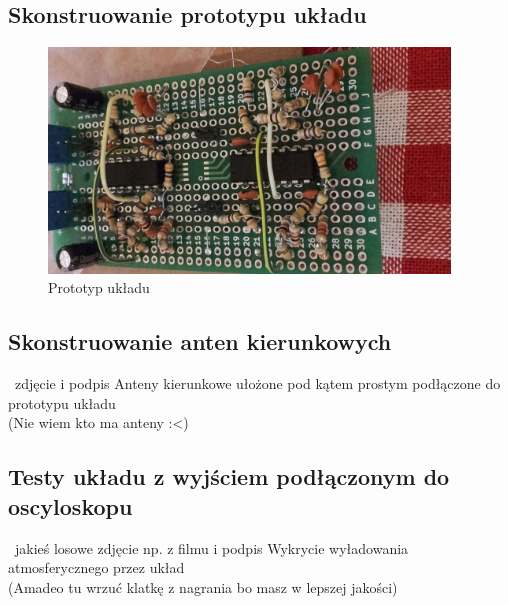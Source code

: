 \documentclass[12pt]{article}
\begin{document}
\subsection{Skonstruowanie prototypu układu}
\begin{figure}[H]
\begin{center}
\includegraphics[width=0.95\textwidth]{figures/plytka.png}
\caption{Prototyp układu}
\end{center}
\end{figure}

\subsection{Skonstruowanie anten kierunkowych}
\ zdjęcie i podpis Anteny kierunkowe ułożone pod kątem prostym podłączone do prototypu układu\\
(Nie wiem kto ma anteny :<)

\subsection{Testy układu z wyjściem podłączonym do oscyloskopu}
\ jakieś losowe zdjęcie np. z filmu i podpis Wykrycie wyładowania atmosferycznego przez układ\\
(Amadeo tu wrzuć klatkę z nagrania bo masz w lepszej jakości)
\end{document}
